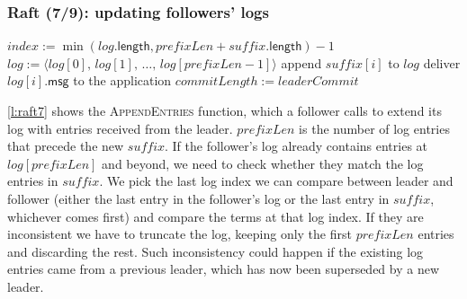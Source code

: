 \begin{frame}
    \label{s:raft7}
    \frametitle{Raft (7/9): updating followers' logs}
    \footnotesize
    \begin{algorithmic}
                \State $\mathit{index} := \min(\mathit{log}.\mathsf{length}, \mathit{prefixLen} + \mathit{suffix}.\mathsf{length}) - 1$
                    \State $\mathit{log} := \langle\mathit{log}[0],\, \mathit{log}[1],\, \dots,\, \mathit{log}[\mathit{prefixLen} - 1]\rangle$
                \EndIf
            \EndIf
                    \State append $\mathit{suffix}[i]$ to $\mathit{log}$
                \EndFor
            \EndIf
                    \State deliver $\mathit{log}[i].\mathsf{msg}$ to the application
                \EndFor
                \State $\mathit{commitLength} := \mathit{leaderCommit}$
            \EndIf
        \EndFunction
        \State
    \end{algorithmic}
\end{frame}
\label{l:raft7}

\autoref{l:raft7} shows the \textsc{AppendEntries} function, which a follower calls to extend its log with entries received from the leader.
$\mathit{prefixLen}$ is the number of log entries that precede the new $\mathit{suffix}$.
If the follower's log already contains entries at $\mathit{log}[\mathit{prefixLen}]$ and beyond, we need to check whether they match the log entries in $\mathit{suffix}$.
We pick the last log index we can compare between leader and follower (either the last entry in the follower's log or the last entry in $\mathit{suffix}$, whichever comes first) and compare the terms at that log index.
If they are inconsistent we have to truncate the log, keeping only the first $\mathit{prefixLen}$ entries and discarding the rest.
Such inconsistency could happen if the existing log entries came from a previous leader, which has now been superseded by a new leader.

